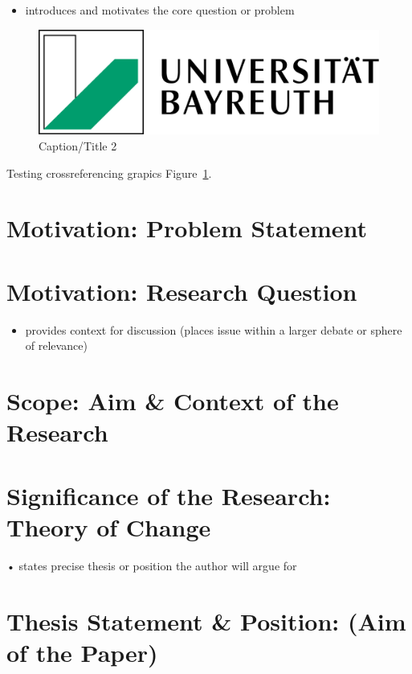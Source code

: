 \documentclass[
  letterpaper,
]{book}
\providecommand{\tightlist}{%
  \setlength{\itemsep}{0pt}\setlength{\parskip}{0pt}}
\begin{document}
\begin{itemize}
\tightlist
\item
  introduces and motivates the core question or problem
\end{itemize}

\begin{figure}

\includegraphics[width=0.3\linewidth,height=\textheight,keepaspectratio]{images/cover.png}

\caption[Short 2 caption]{\label{fig-testgraphic2}Caption/Title 2}

\end{figure}%

Testing crossreferencing grapics Figure~\ref{fig-testgraphic2}.

\section{Motivation: Problem
Statement}\label{motivation-problem-statement}

\section{Motivation: Research
Question}\label{motivation-research-question}

\begin{itemize}
\tightlist
\item
  provides context for discussion (places issue within a larger debate
  or sphere of relevance)
\end{itemize}

\section{Scope: Aim \& Context of the
Research}\label{scope-aim-context-of-the-research}

\section{Significance of the Research: Theory of
Change}\label{significance-of-the-research-theory-of-change}

• states precise thesis or position the author will argue for

\section{Thesis Statement \& Position: (Aim of the
Paper)}\label{thesis-statement-position-aim-of-the-paper}
\end{document}
